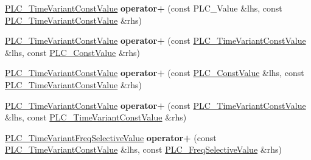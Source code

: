 \begin{DoxyCompactItemize}
\item 
\hypertarget{classns3_1_1PLC__TimeVariantConstValue_a26cacf3740b7b986d62c6b24e418ed49}{\hyperlink{classns3_1_1PLC__TimeVariantConstValue}{\-P\-L\-C\-\_\-\-Time\-Variant\-Const\-Value} {\bfseries operator+} (const \-P\-L\-C\-\_\-\-Value \&lhs, const \hyperlink{classns3_1_1PLC__TimeVariantConstValue}{\-P\-L\-C\-\_\-\-Time\-Variant\-Const\-Value} \&rhs)}\label{classns3_1_1PLC__TimeVariantConstValue_a26cacf3740b7b986d62c6b24e418ed49}

\item 
\hypertarget{classns3_1_1PLC__TimeVariantConstValue_ae4b47b90ef801a627841b1121748ed8d}{\hyperlink{classns3_1_1PLC__TimeVariantConstValue}{\-P\-L\-C\-\_\-\-Time\-Variant\-Const\-Value} {\bfseries operator+} (const \hyperlink{classns3_1_1PLC__TimeVariantConstValue}{\-P\-L\-C\-\_\-\-Time\-Variant\-Const\-Value} \&lhs, const \hyperlink{classns3_1_1PLC__ConstValue}{\-P\-L\-C\-\_\-\-Const\-Value} \&rhs)}\label{classns3_1_1PLC__TimeVariantConstValue_ae4b47b90ef801a627841b1121748ed8d}

\item 
\hypertarget{classns3_1_1PLC__TimeVariantConstValue_a008728a9105a86f7264f1c96414d8127}{\hyperlink{classns3_1_1PLC__TimeVariantConstValue}{\-P\-L\-C\-\_\-\-Time\-Variant\-Const\-Value} {\bfseries operator+} (const \hyperlink{classns3_1_1PLC__ConstValue}{\-P\-L\-C\-\_\-\-Const\-Value} \&lhs, const \hyperlink{classns3_1_1PLC__TimeVariantConstValue}{\-P\-L\-C\-\_\-\-Time\-Variant\-Const\-Value} \&rhs)}\label{classns3_1_1PLC__TimeVariantConstValue_a008728a9105a86f7264f1c96414d8127}

\item 
\hypertarget{classns3_1_1PLC__TimeVariantConstValue_a02c4d0d0278e79435339d99e2e7fbd39}{\hyperlink{classns3_1_1PLC__TimeVariantConstValue}{\-P\-L\-C\-\_\-\-Time\-Variant\-Const\-Value} {\bfseries operator+} (const \hyperlink{classns3_1_1PLC__TimeVariantConstValue}{\-P\-L\-C\-\_\-\-Time\-Variant\-Const\-Value} \&lhs, const \hyperlink{classns3_1_1PLC__TimeVariantConstValue}{\-P\-L\-C\-\_\-\-Time\-Variant\-Const\-Value} \&rhs)}\label{classns3_1_1PLC__TimeVariantConstValue_a02c4d0d0278e79435339d99e2e7fbd39}

\item 
\hypertarget{classns3_1_1PLC__TimeVariantConstValue_aa0651ee3ee605b4d029fcb89d93b5dd2}{\hyperlink{classns3_1_1PLC__TimeVariantFreqSelectiveValue}{\-P\-L\-C\-\_\-\-Time\-Variant\-Freq\-Selective\-Value} {\bfseries operator+} (const \hyperlink{classns3_1_1PLC__TimeVariantConstValue}{\-P\-L\-C\-\_\-\-Time\-Variant\-Const\-Value} \&lhs, const \hyperlink{classns3_1_1PLC__FreqSelectiveValue}{\-P\-L\-C\-\_\-\-Freq\-Selective\-Value} \&rhs)}\label{classns3_1_1PLC__TimeVariantConstValue_aa0651ee3ee605b4d029fcb89d93b5dd2}


\end{DoxyCompactItemize}
